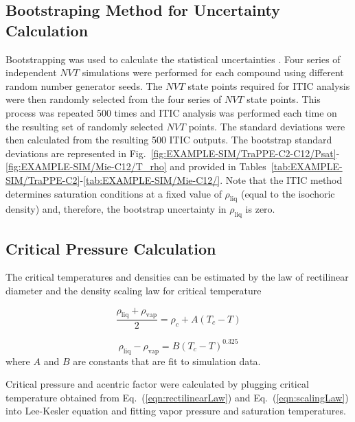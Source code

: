 \documentclass[5p,times]{elsarticle}
\begin{document}
\subsection{Bootstraping Method for Uncertainty Calculation}\label{sec:bootstrapping}
Bootstrapping was used to calculate the statistical uncertainties \cite{Efron1981}. Four series of independent $NVT$ simulations were performed for each compound using different random number generator seeds. The $NVT$ state points required for ITIC analysis were then randomly selected from the four series of $NVT$ state points. This process was repeated 500 times and ITIC analysis was performed each time on the resulting set of randomly selected $NVT$ points. The standard deviations were then calculated from the resulting 500 ITIC outputs. 
The bootstrap standard deviations are represented in Fig.~\ref{fig:EXAMPLE-SIM/TraPPE-C2-C12/Psat}-\ref{fig:EXAMPLE-SIM/Mie-C12/T_rho} and provided in Tables~\ref{tab:EXAMPLE-SIM/TraPPE-C2}-\ref{tab:EXAMPLE-SIM/Mie-C12/}. 
Note that the ITIC method determines saturation conditions at a fixed value of $\rho_{\mathrm{liq}}$ (equal to the isochoric density) and, therefore, the bootstrap uncertainty in $\rho_{\mathrm{liq}}$ is zero.

\subsection{Critical Pressure Calculation}\label{sec:PcCalc}
The critical temperatures and densities can be estimated by the law of rectilinear diameter \cite{Rowlinson1982} and the density scaling law \cite{Rowlinson2013} for critical temperature

\begin{equation}
\frac{\rho_{\mathrm{liq}} +\rho_{\mathrm{vap}}}{2}=\rho_c+A(T_c-T)
\label{eqn:rectilinearLaw}
\end{equation}

\begin{equation}
\rho_{\mathrm{liq}} -\rho_{\mathrm{vap}}=B(T_c-T)^{0.325}
\label{eqn:scalingLaw}
\end{equation}
where $A$ and $B$ are constants that are fit to simulation data.

Critical pressure and acentric factor were calculated by plugging critical temperature obtained from Eq.~(\ref{eqn:rectilinearLaw}) and Eq.~(\ref{eqn:scalingLaw}) into Lee-Kesler equation \cite{Lee1975} and fitting vapor pressure and saturation temperatures.
			
\end{document}
